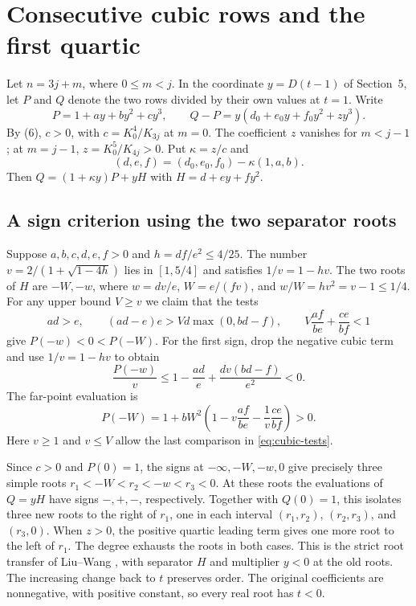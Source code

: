 \section{Consecutive cubic rows and the first quartic}
\label{sec:cubic}

Let \(n=3j+m\), where \(0\le m<j\). In the coordinate \(y=D(t-1)\) of
Section~5, let \(P\) and \(Q\) denote the two rows divided by their own
values at \(t=1\). Write
\[
 P=1+ay+by^2+cy^3,\qquad Q-P=y(d_0+e_0y+f_0y^2+zy^3).
\]
By (6), \(c>0\), with \(c=K_0^4/K_{3j}\) at \(m=0\).
The coefficient \(z\) vanishes for \(m<j-1\); at \(m=j-1\),
\(z=K_0^5/K_{4j}>0\). Put \(\kappa=z/c\) and
\[
 (d,e,f)=(d_0,e_0,f_0)-\kappa(1,a,b).
\]
Then \(Q=(1+\kappa y)P+yH\) with \(H=d+ey+fy^2\).

\subsection{A sign criterion using the two separator roots}

Suppose \(a,b,c,d,e,f>0\) and \(h=df/e^2\le4/25\).
The number \(v=2/(1+\sqrt{1-4h})\) lies in \([1,5/4]\) and satisfies
\(1/v=1-hv\). The two roots of \(H\) are \(-W,-w\), where
\(w=dv/e\), \(W=e/(fv)\), and \(w/W=hv^2=v-1\le1/4\).
For any upper bound \(V\ge v\) we claim that the tests
\begin{equation}
 ad>e,\qquad
 (ad-e)e>Vd\max(0,bd-f),\qquad
 V\frac{af}{be}+\frac{ce}{bf}<1
 \tag{7}
 \label{eq:cubic-tests}
\end{equation}
give \(P(-w)<0<P(-W)\). For the first sign, drop the negative cubic term
and use \(1/v=1-hv\) to obtain
\[
 \frac{P(-w)}{v}\le 1-\frac{ad}{e}
                   +\frac{dv(bd-f)}{e^2}<0.
\]
The far-point evaluation is
\[
 P(-W)=1+bW^2
       \left(1-v\frac{af}{be}-\frac{1}{v}\frac{ce}{bf}\right)>0.
\]
Here \(v\ge1\) and \(v\le V\) allow the last comparison in
\eqref{eq:cubic-tests}.

Since \(c>0\) and \(P(0)=1\), the signs at \(-\infty,-W,-w,0\)
give precisely three simple roots \(r_1<-W<r_2<-w<r_3<0\).
At these roots the evaluations of \(Q=yH\) have signs \(-,+,-\),
respectively. Together with \(Q(0)=1\), this isolates three new roots
to the right of \(r_1\), one in each interval \((r_1,r_2)\),
\((r_2,r_3)\), and \((r_3,0)\). When \(z>0\), the positive quartic
leading term gives one more root to the left of \(r_1\).
The degree exhausts the roots in both cases. This is the strict
root transfer of Liu--Wang \cite[Theorem~2.1]{lw}, with separator \(H\)
and multiplier \(y<0\) at the old roots. The increasing change back
to \(t\) preserves order. The original coefficients are nonnegative,
with positive constant, so every real root has \(t<0\).

